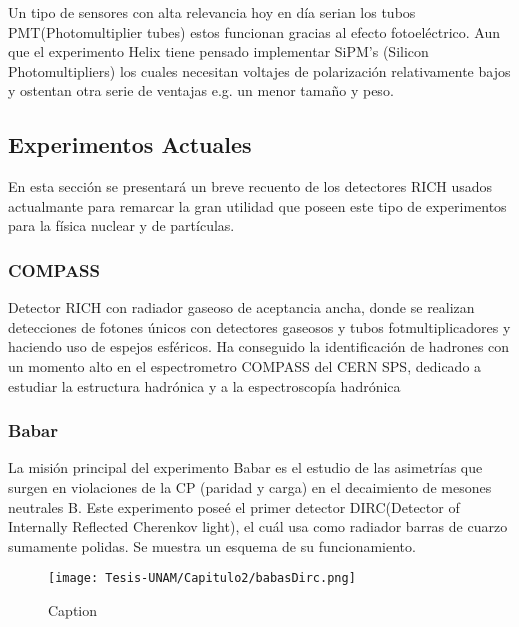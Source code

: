 Un tipo de  sensores con alta relevancia hoy en día serian los tubos PMT(Photomultiplier tubes) estos funcionan gracias al efecto fotoeléctrico. Aun que el experimento Helix tiene pensado implementar SiPM's (Silicon Photomultipliers) los cuales necesitan voltajes de polarización relativamente bajos y ostentan otra serie de ventajas e.g. un menor tamaño y peso.





\subsection{Experimentos Actuales}
En esta sección se presentará un breve recuento de los detectores RICH usados actualmante para remarcar la gran utilidad que poseen este tipo de experimentos para la física nuclear y de partículas.

\subsubsection{COMPASS} Detector RICH con radiador gaseoso de aceptancia ancha, donde se realizan detecciones de fotones únicos con detectores gaseosos y tubos fotmultiplicadores y haciendo uso de espejos esféricos. Ha conseguido la identificación de hadrones con un momento alto en el espectrometro COMPASS del CERN SPS, dedicado a estudiar la estructura hadrónica y a la espectroscopía hadrónica \cite{ALBRECHT2003112}

\subsubsection{Babar} La misión principal del experimento Babar es el estudio de las asimetrías que surgen en violaciones de la CP (paridad y carga) en el decaimiento de mesones neutrales B. Este experimento poseé el primer detector DIRC(Detector of Internally Reflected Cherenkov light), el cuál usa como radiador barras de cuarzo sumamente polidas. Se muestra un esquema de su funcionamiento.\cite{babas}

\begin{figure}[h!]
    \centering
    \texttt{[image: Tesis-UNAM/Capitulo2/babasDirc.png]}
    \caption{Caption}
    \label{DIRC del detector Babar}
\end{figure}


